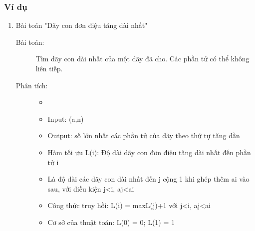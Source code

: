 \subsubsection{Ví dụ}
\begin{enumerate}
    \item Bài toán "Dãy con đơn điệu tăng dài nhất"
    \begin{description}
        \item[Bài toán:] Tìm dãy con dài nhất của một dãy đã cho. Các phần tử có thể không liên tiếp.
        \item[Phân tích:]
            \begin{itemize}
                \item[]
                \item Input: (a,n)
                \item Output: số lớn nhất các phần tử của dãy theo thứ tự tăng dần
                \item Hàm tối ưu L(i): Độ dài dãy con đơn điệu tăng dài nhất đến phần tử i
                \item[]Là độ dài các dãy con dài nhất đến j cộng 1 khi ghép thêm ai vào sau, với
                điều kiện j<i, aj<ai
                \item Công thức truy hồi: L(i) = max{L(j)}+1 với j<i, aj<ai
                \item Cơ sở của thuật toán: L(0) = 0; L(1) = 1
            \end{itemize}
        

\end{description}
\end{enumerate}
